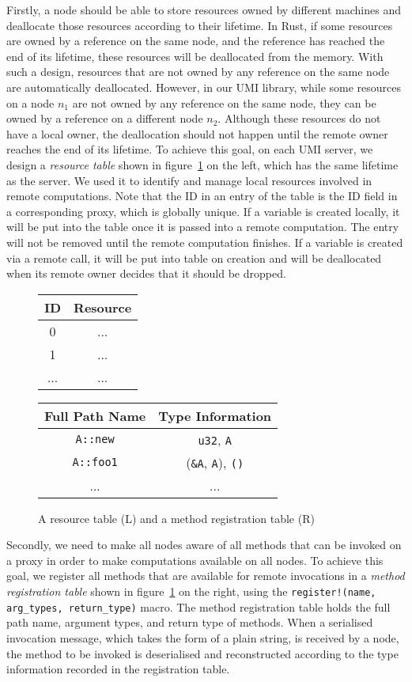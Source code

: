 Firstly, a node should be able to store resources owned by different machines and deallocate those resources according to their lifetime.
In Rust, if some resources are owned by a reference on the same node, and the reference has reached the end of its lifetime, these resources will be deallocated from the memory. With such a design, resources that are not owned by any reference on the same node are automatically deallocated. However, in our UMI library, while some resources on a node $n_1$ are not owned by any reference on the same node, they can be owned by a reference on a different node $n_2$. Although these resources do not have a local owner, the deallocation should not happen until the remote owner reaches the end of its lifetime. 
To achieve this goal, on each UMI server, we design a \emph{resource table} shown in figure~\ref{chap3:impl:tables} on the left, which has the same lifetime as the server. We used it to identify and manage local resources involved in remote computations. Note that the ID in an entry of the table is the ID field in a corresponding proxy, which is globally unique.
If a variable is created locally, it will be put into the table once it is passed into a remote computation. The entry will not be removed until the remote computation finishes. If a variable is created via a remote call, it will be put into table on creation and will be deallocated when its remote owner decides that it should be dropped.
\begin{figure}
\centering
\begin{tabular}{ |c|c| } 
\hline
\textbf{ID} & \textbf{Resource} \\\hline
0 & ... \\\hline
1 & ... \\\hline
... & ... \\
\hline
\end{tabular}
\quad
\begin{tabular}{ |c|c| } 
\hline
\textbf{Full Path Name} & \textbf{Type Information} \\\hline
\texttt{A::new} & \texttt{u32}, \texttt{A} \\\hline
\texttt{A::foo1} &  (\texttt{\&A}, \texttt{A}), \texttt{()} \\\hline
... & ... \\
\hline
\end{tabular}
\caption{A resource table (L) and a method registration table (R)}
\label{chap3:impl:tables}
\end{figure}

Secondly, we need to make all nodes aware of all methods that can be invoked on a proxy in order to make computations available on all nodes. To achieve this goal, we register all methods that are available for remote invocations in a \emph{method registration table} shown in figure~\ref{chap3:impl:tables} on the right, using the \texttt{register!(name, arg\_types, return\_type)} macro. The method registration table holds the full path name, argument types, and return type of methods. When a serialised invocation message, which takes the form of a plain string, is received by a node, the method to be invoked is deserialised and reconstructed according to the type information recorded in the registration table.

